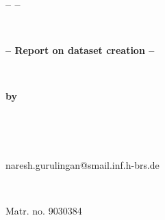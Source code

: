 \begin{titlepage}
\begin{minipage}[t]{0.5\textwidth}
\begin{Large}
    \begin{flushleft}
      \hspace{1cm} 
    \end{flushleft}
\end{Large}
\end{minipage}

\vspace{0.07\textheight}
\begin{center}
 \begin{Large} \textbf{\ThesisUniversityCourse} \end{Large}\\
 \vspace{1em}
 \begin{Large} \textbf{-- \ThesisSemester --} \end{Large}\\
 \vspace{2em}
 \begin{Huge} \begin{spacing}{1.3} \textbf{\ThesisTitle} \end{spacing} \end{Huge}
 \vspace{2em}
 \begin{Large} \textbf{-- Report on dataset creation --} \end{Large}\\
 \vspace{2em}
  \begin{Large}\textbf{by} \end{Large}\\
 
 \vspace{2em}
 \begin{Large}\textbf{\ThesisAuthora}\end{Large}\\
 \begin{small}naresh.gurulingan@smail.inf.h-brs.de\end{small}\\
 \begin{small} Matr. no. 9030384\end{small}\\
\end{center}
\end{titlepage}
